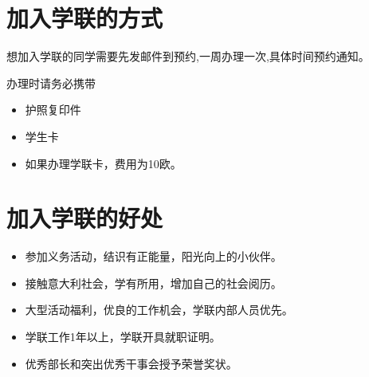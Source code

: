 \section{加入学联的方式}
想加入学联的同学需要先发邮件到预约,一周办理一次,具体时间预约通知。


办理时请务必携带 
\begin{itemize}
\item 护照复印件
\item 学生卡
\item 如果办理学联卡，费用为10欧。
\end{itemize}

\section{加入学联的好处}
\begin{itemize}
\item 参加义务活动，结识有正能量，阳光向上的小伙伴。
\item 接触意大利社会，学有所用，增加自己的社会阅历。
\item 大型活动福利，优良的工作机会，学联内部人员优先。
\item 学联工作1年以上，学联开具就职证明。
\item 优秀部长和突出优秀干事会授予荣誉奖状。
\end{itemize}
